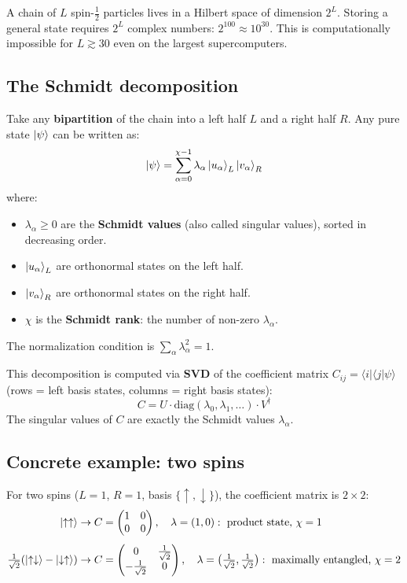 \documentclass[11pt, a4paper]{article}
\begin{document}
A chain of $L$ spin-$\tfrac{1}{2}$ particles lives in a Hilbert space of dimension $2^L$.
Storing a general state requires $2^L$ complex numbers: $2^{100} \approx 10^{30}$.
This is computationally impossible for $L \gtrsim 30$ even on the largest supercomputers.

\subsection{The Schmidt decomposition}

Take any \textbf{bipartition} of the chain into a left half $L$ and a right half $R$.
Any pure state $\ket{\psi}$ can be written as:
\begin{equation}
  \ket{\psi} = \sum_{\alpha=0}^{\chi-1} \lambda_\alpha \ket{u_\alpha}_L \ket{v_\alpha}_R
  \label{eq:schmidt}
\end{equation}
where:
\begin{itemize}
  \item $\lambda_\alpha \geq 0$ are the \textbf{Schmidt values} (also called singular values), sorted in decreasing order.
  \item $\ket{u_\alpha}_L$ are orthonormal states on the left half.
  \item $\ket{v_\alpha}_R$ are orthonormal states on the right half.
  \item $\chi$ is the \textbf{Schmidt rank}: the number of non-zero $\lambda_\alpha$.
\end{itemize}
The normalization condition is $\sum_\alpha \lambda_\alpha^2 = 1$.

This decomposition is computed via \textbf{SVD} of the coefficient matrix $C_{ij} = \langle i \vert \langle j \vert \psi \rangle$ (rows = left basis states, columns = right basis states):
\begin{equation}
  C = U \cdot \mathrm{diag}(\lambda_0, \lambda_1, \ldots) \cdot V^\dagger
\end{equation}
The singular values of $C$ are exactly the Schmidt values $\lambda_\alpha$.

\subsection{Concrete example: two spins}

For two spins ($L = 1$, $R = 1$, basis $\{\uparrow, \downarrow\}$), the coefficient matrix is $2\times 2$:
\begin{align}
  \ket{\uparrow\uparrow} &\to C = \begin{pmatrix}1&0\\0&0\end{pmatrix}, \quad
  \lambda = (1, 0): \text{ product state, } \chi = 1 \\[4pt]
  \tfrac{1}{\sqrt{2}}(\ket{\uparrow\downarrow} - \ket{\downarrow\uparrow}) &\to C = \begin{pmatrix}0&\tfrac{1}{\sqrt{2}}\\-\tfrac{1}{\sqrt{2}}&0\end{pmatrix}, \quad
  \lambda = \bigl(\tfrac{1}{\sqrt{2}}, \tfrac{1}{\sqrt{2}}\bigr): \text{ maximally entangled, } \chi = 2
\end{align}
\end{document}
